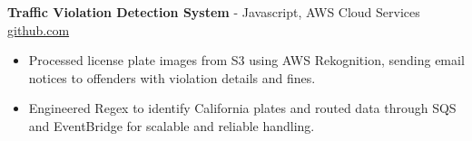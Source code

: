 \documentclass[11pt]{article}       %
\begin{document}

\textbf{Traffic Violation Detection System}{ - Javascript, AWS Cloud Services} \hfill \href{https://github.com/Monica20030707/AWS_rekonigition-N-read-database}{github.com} \\
\vspace{-9pt}
\begin{itemize}
  \item Processed license plate images from S3 using AWS Rekognition, sending email notices to offenders with violation details and fines.
  \item Engineered Regex to identify California plates and routed data through SQS and EventBridge for scalable and reliable handling.
\end{itemize}
\end{document}
